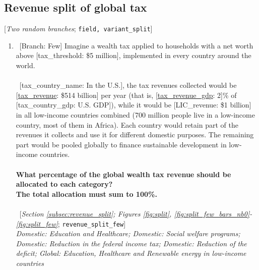 \documentclass[12pt,english]{article}
\begin{document}
\begin{bibunit}
 \subsection*{Revenue split of global tax} 
 [\textit{Two random branches};  \verb|field, variant_split|] 
 \begin{enumerate}[resume] 
\item ~[Branch: Few] \label{q:revenue_split_few} Imagine a wealth tax applied to households with a net worth above [tax\_threshold: \$5 million], implemented in every country around the world.
~\\\\ 
~[tax\_country\_name: In the U.S.], the tax revenues collected would be [\hyperlink{tab_features}{tax\_revenue}: \$514 billion] per year (that is, [\hyperlink{tab_features}{tax\_revenue\_gdp}: 2]\% of [tax\_country\_gdp: U.S. GDP]), while it would be [LIC\_revenue: \$1 billion] in all low-income countries combined (700 million people live in a low-income country, most of them in Africa).
Each country would retain part of the revenues it collects and use it for different domestic purposes. The remaining part would be pooled globally to finance sustainable development in low-income countries.
~\\\\\textbf{What percentage of the global wealth tax revenue should be allocated to each category?} \\\textbf{The total allocation must sum to 100\%.}\\\\ 
~[\textit{Section \ref{subsec:revenue_split}; Figures \ref{fig:split}, \ref{fig:split_few_bars_nb0}-\ref{fig:split_few}}; 
\verb|revenue_split_few|]
  \\ \textit{Domestic: Education and Healthcare; Domestic: Social welfare programs; Domestic: Reduction in the federal income tax; Domestic: Reduction of the deficit; Global: Education, Healthcare and Renewable energy in low-income countries}


\end{enumerate}
\end{bibunit}
\end{document}
